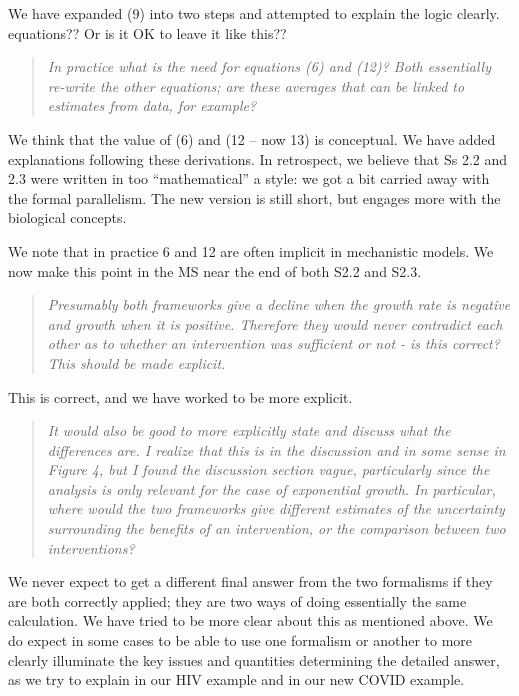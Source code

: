 We have expanded (9) into two steps and attempted to explain the logic
clearly. 
equations?? Or is it OK to leave it like this??

\begin{quote}\sl
In practice what is the need for equations (6) and (12)? Both
essentially re-write the other equations; are these averages that can be
linked to estimates from data, for example?
\end{quote}

We think that the value of (6) and (12 -- now 13) is conceptual. We have
added explanations following these derivations. In retrospect, we
believe that Ss 2.2 and 2.3 were written in too ``mathematical'' a
style: we got a bit carried away with the formal parallelism. The new
version is still short, but engages more with the biological concepts.

We note that in practice 6 and 12 are often implicit in mechanistic models. We now make this point in the MS near the end of both S2.2 and S2.3.

\begin{quote}\sl
Presumably both frameworks give a decline when the growth rate is
negative and growth when it is positive. Therefore they would never
contradict each other as to whether an intervention was sufficient or
not - is this correct? This should be made explicit.
\end{quote}

This is correct, and we have worked to be more explicit. 

\begin{quote}\sl
It would also be good to more explicitly state and discuss what the
differences are. I realize that this is in the discussion and in some
sense in Figure 4, but I found the discussion section vague,
particularly since the analysis is only relevant for the case of
exponential growth. In particular, where would the two frameworks give
different estimates of the uncertainty surrounding the benefits of an
intervention, or the comparison between two interventions?
\end{quote}

We never expect to get a different final answer from the two formalisms if they are both correctly applied;
they are two ways of doing essentially the same calculation. 
We have tried to be more clear about this as mentioned above. 
We do expect in some cases to be able to use one formalism or another to more clearly illuminate the key issues and quantities determining the detailed answer, as we try to explain in our HIV example and in our new COVID example.

